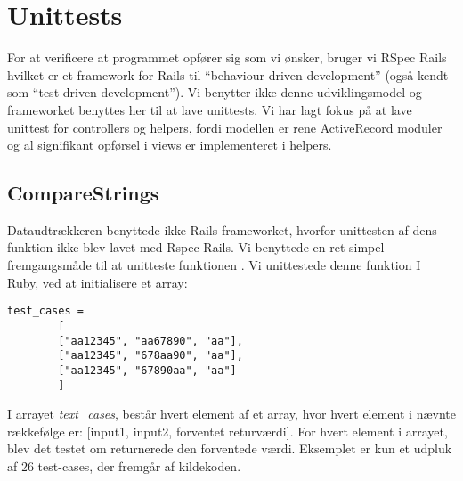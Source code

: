 \section{Unittests}
\label{sec:unittests}
For at verificere at programmet opfører sig som vi ønsker, bruger vi RSpec Rails hvilket er et framework for Rails til ``behaviour-driven development'' (også kendt som ``test-driven development''). Vi benytter ikke denne udviklingsmodel og frameworket benyttes her til at lave unittests.
Vi har lagt fokus på at lave unittest for controllers og helpers, fordi modellen er rene ActiveRecord moduler og al signifikant opførsel i views er implementeret i helpers.

\subsection{CompareStrings}
Dataudtrækkeren benyttede ikke Rails frameworket, hvorfor unittesten af dens funktion  ikke blev lavet med Rspec Rails. Vi benyttede en ret simpel fremgangsmåde til at unitteste funktionen . Vi unittestede denne funktion I Ruby, ved at initialisere et array:
\begin{lstlisting}
test_cases = 
		[
		["aa12345", "aa67890", "aa"],
		["aa12345", "678aa90", "aa"],
		["aa12345", "67890aa", "aa"]
		]
\end{lstlisting}
I arrayet \textit{text\_cases}, består hvert element af et array, hvor hvert element i nævnte rækkefølge er: [input1, input2, forventet returværdi].
For hvert element i arrayet, blev det testet om  returnerede den forventede værdi. Eksemplet er kun et udpluk af 26 test-cases, der fremgår af kildekoden.